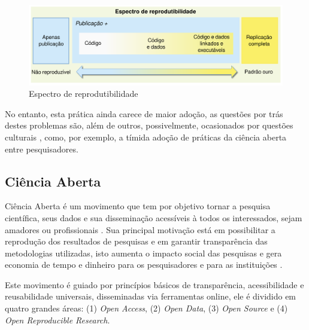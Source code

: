 \begin{figure}[h]
  \center
  \includegraphics[scale=0.3]{imagens/reproducibility-spectrum-ptbr.png}
  \caption{Espectro de reprodutibilidade \cite{peng2011reproducible}}
  \label{reproducibility-spectrum}
\end{figure}


No entanto, esta prática ainda carece de maior adoção, as questões por trás
destes problemas são, além de outros, possivelmente, ocasionados por questões
culturais \cite{niemeyer2017open}, como, por exemplo, a tímida adoção de
práticas da ciência aberta entre pesquisadores.

\subsection{Ciência Aberta}

Ciência Aberta é um movimento que tem por objetivo tornar a pesquisa
científica, seus dados e sua disseminação acessíveis à todos os interessados,
sejam amadores ou profissionais \cite{WikipediaOpenScience}. Sua principal
motivação está em possibilitar a reprodução dos resultados de pesquisas e em
garantir transparência das metodologias utilizadas, isto aumenta o impacto
social das pesquisas e gera economia de tempo e dinheiro para os pesquisadores
e para as instituições \cite{nesta2010open}.

Este movimento é guiado por princípios básicos de transparência, acessibilidade
e reusabilidade universais, disseminadas via ferramentas online, ele é dividido
em quatro grandes áreas: (1) {\it Open Access}, (2) {\it Open Data}, (3) {\it
Open Source} e (4) {\it Open Reproducible Research}.


